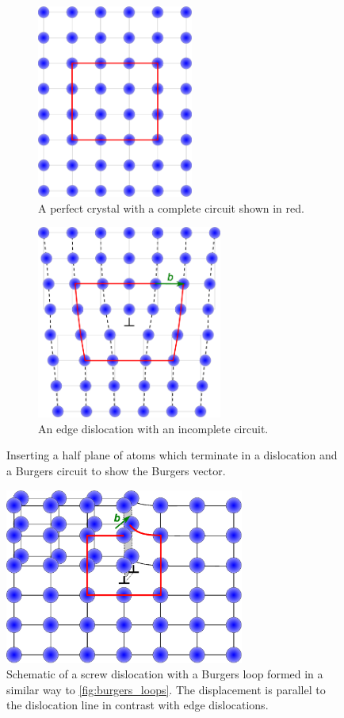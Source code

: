 \begin{figure}
\centering

\begin{subfigure}{0.4\textwidth}
\centering
\includegraphics[height=2.5in]{Perfect_crystal_loop}
\caption{A perfect crystal with a complete circuit shown in red.}
\end{subfigure}
\begin{subfigure}{0.4\textwidth}
\centering
\includegraphics[height=2.5in]{Edge_Dislocation_loop}
\caption{An edge dislocation with an incomplete circuit. \label{fig:Edge_disloc_loop}}
\end{subfigure}

\caption{Inserting a half plane of atoms which terminate in a dislocation and a Burgers circuit to show the Burgers vector. \label{fig:burgers_loops}}

\end{figure}

\begin{figure}
\centering
\includegraphics[width=0.7\textwidth]{screw_disloc_loop}
\caption{Schematic of a screw dislocation with a Burgers loop formed in a similar way to \autoref{fig:burgers_loops}. The displacement is parallel to the dislocation line in contrast with edge dislocations. \label{fig:screw_disloc}}
\end{figure}




